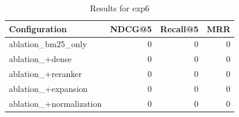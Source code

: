 \begin{table}[htbp]
  \centering
  \caption{Results for exp6}
  \label{tab:exp6}
  \begin{tabular}{lrrr}
    \toprule
    Configuration & NDCG@5 & Recall@5 & MRR \\
    \midrule
    ablation_bm25_only & 0 & 0 & 0 \\
    ablation_+dense & 0 & 0 & 0 \\
    ablation_+reranker & 0 & 0 & 0 \\
    ablation_+expansion & 0 & 0 & 0 \\
    ablation_+normalization & 0 & 0 & 0 \\
    \bottomrule
  \end{tabular}
\end{table}